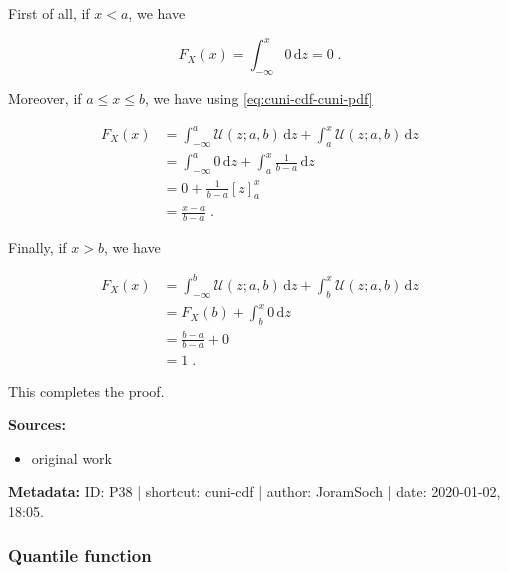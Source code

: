 \documentclass[a4paper,12pt,twoside]{book}
\begin{document}
First of all, if $x < a$, we have

\begin{equation} \label{eq:cuni-cdf-cuni-cdf-s2a}
F_X(x) = \int_{-\infty}^{x} 0 \, \mathrm{d}z = 0 \; .
\end{equation}

Moreover, if $a \leq x \leq b$, we have using \eqref{eq:cuni-cdf-cuni-pdf}

\begin{equation} \label{eq:cuni-cdf-cuni-cdf-s2b}
\begin{split}
F_X(x) &= \int_{-\infty}^{a} \mathcal{U}(z; a, b) \, \mathrm{d}z + \int_{a}^{x} \mathcal{U}(z; a, b) \, \mathrm{d}z \\
&= \int_{-\infty}^{a} 0 \, \mathrm{d}z + \int_{a}^{x} \frac{1}{b-a} \, \mathrm{d}z \\
&= 0 + \frac{1}{b-a} [z]_a^x \\
&= \frac{x-a}{b-a} \; .
\end{split}
\end{equation}

Finally, if $x > b$, we have

\begin{equation} \label{eq:cuni-cdf-cuni-cdf-s2c}
\begin{split}
F_X(x) &= \int_{-\infty}^{b} \mathcal{U}(z; a, b) \, \mathrm{d}z + \int_{b}^{x} \mathcal{U}(z; a, b) \, \mathrm{d}z \\
&= F_X(b) + \int_{b}^{x} 0 \, \mathrm{d}z \\
&= \frac{b-a}{b-a} + 0 \\
&= 1 \; .
\end{split}
\end{equation}

This completes the proof.


\vspace{1em}
\textbf{Sources:}
\begin{itemize}
\item original work\end{itemize}


\vspace{1em}
\textbf{Metadata:} ID: P38 | shortcut: cuni-cdf | author: JoramSoch | date: 2020-01-02, 18:05.
\vspace{1em}



\subsubsection[\textbf{Quantile function}]{Quantile function} \label{sec:cuni-qf}
\setcounter{equation}{0}
\end{document}
